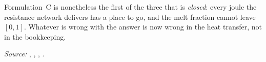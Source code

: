 Formulation~C is nonetheless the first of the three that is \emph{closed}: every
joule the resistance network delivers has a place to go, and the melt fraction
cannot leave $[0,1]$. Whatever is wrong with the answer is now wrong in the heat
transfer, not in the bookkeeping.

\emph{Source:} , ,
, .

